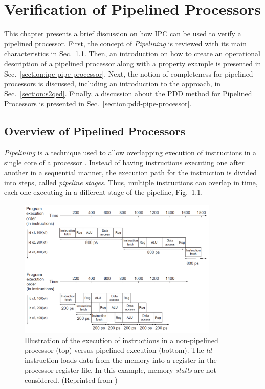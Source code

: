 \chapter{Verification of Pipelined Processors}
\label{chapter:pipeline}

This chapter presents a brief discussion on how IPC can be used to verify a pipelined processor. First, the concept of \textit{Pipelining} is reviewed with its main characteristics in Sec.~\ref{section:pipe-overview}. Then, an introduction on how to create an operational description of a pipelined processor along with a property example is presented in Sec.~\ref{section:ipc-pipe-processor}. Next, the notion of completeness for pipelined processors is discussed, including an introduction to the \SSQED{} approach, in Sec.~\ref{section:s2qed}. Finally, a discussion about the PDD method for Pipelined Processors is presented in Sec.~\ref{section:pdd-pipe-processor}.  

\section{Overview of Pipelined Processors}
\label{section:pipe-overview}

\textit{Pipelining} is a technique used to allow overlapping execution of instructions in a single core of a processor \cite{book-comp-org}. Instead of having instructions executing one after another in a sequential manner, the execution path for the instruction is divided into steps, called \textit{pipeline stages}. Thus, multiple instructions can overlap in time, each one executing in a different stage of the pipeline, Fig.~\ref{fig:pipe-example}.

\begin{figure}[htb!]
	\centering
	\includegraphics[width=0.85\textwidth]{images/pipeline-example.PNG}
	\caption{Illustration of the execution of instructions in a non-pipelined processor (top) versus pipelined execution (bottom). The \textit{ld} instruction loads data from the memory into a register in the processor register file. In this example, memory \textit{stalls} are not considered. (Reprinted from \cite{book-comp-org})}
	\label{fig:pipe-example}
\end{figure}


